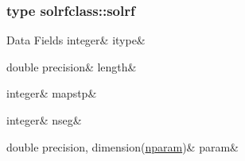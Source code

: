 \subsubsection{type solrfclass\+::solrf}
\begin{DoxyFields}{Data Fields}
\mbox{\label{namespacesolrfclass_af3ec222ea47a2e9d6dea703d94927750}} 
integer&
itype&
\\
\hline

\mbox{\label{namespacesolrfclass_a6fbb4ce6f8918840cadf9ee8e16769f9}} 
double precision&
length&
\\
\hline

\mbox{\label{namespacesolrfclass_af5533539dedb70fb85e93b1a76a7a55d}} 
integer&
mapstp&
\\
\hline

\mbox{\label{namespacesolrfclass_a1825472ba9b6dfe1d7ca72bfc85f0532}} 
integer&
nseg&
\\
\hline

\mbox{\label{namespacesolrfclass_a10deafd1e7cbd79c86c62766f73105f9}} 
double precision, dimension(\mbox{\hyperlink{namespacesolrfclass_a01b965e25069cff9fb1797fbbcb9939d}{nparam}})&
param&
\\
\hline

\end{DoxyFields}
